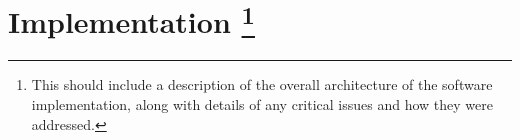 \documentclass[sn-mathphys,Numbered, lineno]{sn-jnl}  %
\theoremstyle{thmstyleone}%
\theoremstyle{thmstyletwo}%
\theoremstyle{thmstylethree}%
\begin{document}


    



 
\section*{
    Implementation
    \footnote{
        This should include a description of the overall architecture of the software implementation, along with details of any critical issues and how they were addressed.
    }
}
\label{sec:implementation}
\end{document}

